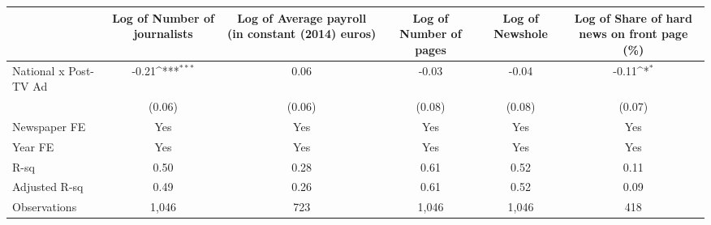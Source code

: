 {
\def\sym#1{\ifmmode^{#1}\else\(^{#1}\)\fi}
\begin{tabular}{l*{5}{c}}
\hline\hline
                    &\multicolumn{1}{c}{Log of Number of journalists}&\multicolumn{1}{c}{Log of  Average payroll (in constant (2014) euros)}&\multicolumn{1}{c}{Log of Number of pages}&\multicolumn{1}{c}{Log of  Newshole}&\multicolumn{1}{c}{Log of Share of hard news on front page (\%)}\\
\hline
National x Post-TV Ad&       -0.21\sym{***}&        0.06         &       -0.03         &       -0.04         &       -0.11\sym{*}  \\
                    &      (0.06)         &      (0.06)         &      (0.08)         &      (0.08)         &      (0.07)         \\
\hline
Newspaper FE        &         Yes         &         Yes         &         Yes         &         Yes         &         Yes         \\
Year FE             &         Yes         &         Yes         &         Yes         &         Yes         &         Yes         \\
R-sq                &        0.50         &        0.28         &        0.61         &        0.52         &        0.11         \\
Adjusted R-sq       &        0.49         &        0.26         &        0.61         &        0.52         &        0.09         \\
Observations        &       1,046         &         723         &       1,046         &       1,046         &         418         \\
\hline\hline
\end{tabular}
}
